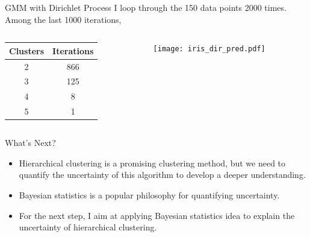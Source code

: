 \documentclass{beamer}
\begin{document}
	\begin{frame}{GMM with Dirichlet Process}
		I loop through the 150 data points 2000 times. Among the last 1000 iterations,
		\begin{columns}
			\begin{column}{0.3\textwidth}
				
				\begin{table}[htbp]
					\small
					\centering
					\begin{tabular}{cc}
						\toprule
						Clusters & Iterations\\
						\midrule
						2 & 866\\
						3 & 125 \\
						4& 8 \\
						5& 1\\
						\bottomrule
					\end{tabular}
				\end{table}
			\end{column}
			\begin{column}{0.7\textwidth}
				\begin{figure}[htbp]
					\centering
					\texttt{[image: iris\_dir\_pred.pdf]}
				\end{figure}
			\end{column}
		\end{columns} 
	\end{frame}

	\begin{frame}{What's Next?}
		\begin{itemize}
			\item Hierarchical clustering is a promising clustering method, but we need to quantify the uncertainty of this algorithm to develop a deeper understanding.
			\item Bayesian statistics is a popular philosophy for quantifying uncertainty.
			\item For the next step, I aim at applying Bayesian statistics idea to explain the uncertainty of hierarchical clustering.
		\end{itemize}
	\end{frame}
\end{document}

